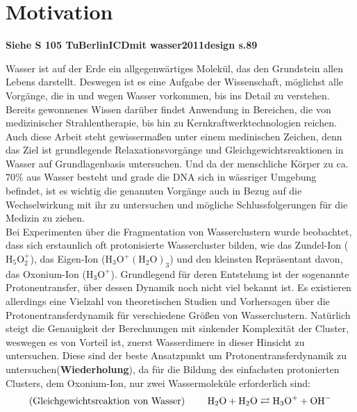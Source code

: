 
  \chapter{Motivation} \label{sec:Motivation}
  
  \textbf{Siehe S 105 TuBerlinICDmit wasser2011design s.89}
  
  Wasser ist auf der Erde ein allgegenwärtiges Molekül, das den Grundstein allen Lebens darstellt. Deswegen ist es eine Aufgabe der Wissenschaft, möglichst alle Vorgänge, die in und wegen Wasser vorkommen, bis ins Detail zu verstehen. Bereits gewonnenes Wissen darüber findet Anwendung in Bereichen, die von medizinischer Strahlentherapie, bis hin zu Kernkraftwerktechnologien reichen. 
  Auch diese Arbeit steht gewissermaßen unter einem medinischen Zeichen, denn das Ziel ist grundlegende Relaxationsvorgänge und Gleichgewichtsreaktionen in Wasser auf Grundlagenbasis untersuchen. Und da der menschliche Körper zu ca. 70\% aus Wasser besteht und grade die DNA sich in wässriger Umgebung befindet, ist es wichtig die genannten Vorgänge auch in Bezug auf die Wechselwirkung mit ihr zu untersuchen und mögliche Schlussfolgerungen für die Medizin zu ziehen.\\
  Bei Experimenten über die Fragmentation von Wasserclustern wurde beobachtet, dass sich erstaunlich oft protonisierte Wassercluster bilden, wie das Zundel-Ion ($\mathrm{H_5O_2^+}$), das Eigen-Ion ($\mathrm{H_3O^+(H_2O)_3}$) und den kleinsten Repräsentant davon, das Oxonium-Ion ($\mathrm{H_3O^+}$). Grundlegend für deren Entstehung ist der sogenannte Protonentransfer, über dessen Dynamik noch nicht viel bekannt ist. Es existieren allerdings eine Vielzahl von theoretischen Studien und Vorhersagen über die Protonentransferdynamik für verschiedene Größen von Wasserclustern. Natürlich steigt die Genauigkeit der Berechnungen mit sinkender Komplexität der Cluster, weswegen es von Vorteil ist, zuerst Wasserdimere in dieser Hinsicht zu untersuchen. Diese sind der beste Ansatzpunkt um Protonentransferdynamik zu untersuchen(\textbf{Wiederholung}), da für die Bildung des einfachsten protonierten Clusters, dem Oxonium-Ion, nur zwei Wassermoleküle erforderlich sind:
  \begin{equation}
  \textmd{{(Gleichgewichtsreaktion von Wasser) }}\qquad \textmd{H}_2\textmd{O} + \textmd{H}_2\textmd{O} \rightleftarrows \textmd{H}_3\textmd{O}^+ + \textmd{O}\textmd{H}^- 
  \end{equation} 
  

